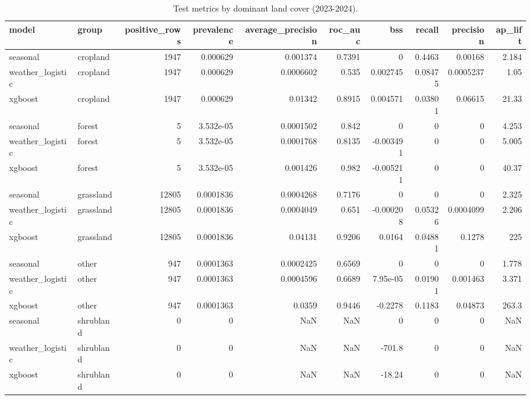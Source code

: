 \begin{table}
\caption{Test metrics by dominant land cover (2023-2024).}
\label{tab:T7_landcover}
\begin{tabular}{llrrrrrrrr}
\toprule
model & group & positive_rows & prevalence & average_precision & roc_auc & bss & recall & precision & ap_lift \\
\midrule
seasonal & cropland & 1947 & 0.000629 & 0.001374 & 0.7391 & 0 & 0.4463 & 0.00168 & 2.184 \\
weather_logistic & cropland & 1947 & 0.000629 & 0.0006602 & 0.535 & 0.002745 & 0.08475 & 0.0005237 & 1.05 \\
xgboost & cropland & 1947 & 0.000629 & 0.01342 & 0.8915 & 0.004571 & 0.03801 & 0.06615 & 21.33 \\
seasonal & forest & 5 & 3.532e-05 & 0.0001502 & 0.842 & 0 & 0 & 0 & 4.253 \\
weather_logistic & forest & 5 & 3.532e-05 & 0.0001768 & 0.8135 & -0.003491 & 0 & 0 & 5.005 \\
xgboost & forest & 5 & 3.532e-05 & 0.001426 & 0.982 & -0.005211 & 0 & 0 & 40.37 \\
seasonal & grassland & 12805 & 0.0001836 & 0.0004268 & 0.7176 & 0 & 0 & 0 & 2.325 \\
weather_logistic & grassland & 12805 & 0.0001836 & 0.0004049 & 0.651 & -0.000208 & 0.05326 & 0.0004099 & 2.206 \\
xgboost & grassland & 12805 & 0.0001836 & 0.04131 & 0.9206 & 0.0164 & 0.04881 & 0.1278 & 225 \\
seasonal & other & 947 & 0.0001363 & 0.0002425 & 0.6569 & 0 & 0 & 0 & 1.778 \\
weather_logistic & other & 947 & 0.0001363 & 0.0004596 & 0.6689 & 7.95e-05 & 0.01901 & 0.001463 & 3.371 \\
xgboost & other & 947 & 0.0001363 & 0.0359 & 0.9446 & -0.2278 & 0.1183 & 0.04873 & 263.3 \\
seasonal & shrubland & 0 & 0 & NaN & NaN & 0 & 0 & 0 & NaN \\
weather_logistic & shrubland & 0 & 0 & NaN & NaN & -701.8 & 0 & 0 & NaN \\
xgboost & shrubland & 0 & 0 & NaN & NaN & -18.24 & 0 & 0 & NaN \\
\bottomrule
\end{tabular}
\end{table}
